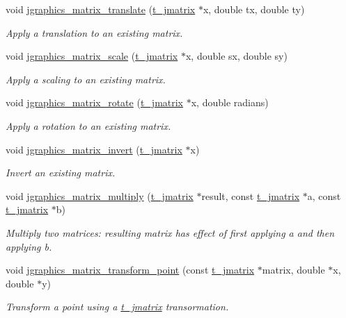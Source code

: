 \begin{DoxyCompactItemize}
void \hyperlink{group__jmatrix_gaf39440de92c4e2164d233761af8ba4b9}{jgraphics\_\-matrix\_\-translate} (\hyperlink{structt__jmatrix}{t\_\-jmatrix} $\ast$x, double tx, double ty)
\begin{DoxyCompactList}\small\item\em Apply a translation to an existing matrix. \item\end{DoxyCompactList}\item 
void \hyperlink{group__jmatrix_gaac1ee9b0dc5e54cc0cb8e5a213df1b51}{jgraphics\_\-matrix\_\-scale} (\hyperlink{structt__jmatrix}{t\_\-jmatrix} $\ast$x, double sx, double sy)
\begin{DoxyCompactList}\small\item\em Apply a scaling to an existing matrix. \item\end{DoxyCompactList}\item 
void \hyperlink{group__jmatrix_gabbe882c283d57b37da55cd4d069b55dc}{jgraphics\_\-matrix\_\-rotate} (\hyperlink{structt__jmatrix}{t\_\-jmatrix} $\ast$x, double radians)
\begin{DoxyCompactList}\small\item\em Apply a rotation to an existing matrix. \item\end{DoxyCompactList}\item 
void \hyperlink{group__jmatrix_gae46840f2ac22aee22c9b211d60f4b381}{jgraphics\_\-matrix\_\-invert} (\hyperlink{structt__jmatrix}{t\_\-jmatrix} $\ast$x)
\begin{DoxyCompactList}\small\item\em Invert an existing matrix. \item\end{DoxyCompactList}\item 
void \hyperlink{group__jmatrix_ga496e878760928eaa1226a3ddf7e265a7}{jgraphics\_\-matrix\_\-multiply} (\hyperlink{structt__jmatrix}{t\_\-jmatrix} $\ast$result, const \hyperlink{structt__jmatrix}{t\_\-jmatrix} $\ast$a, const \hyperlink{structt__jmatrix}{t\_\-jmatrix} $\ast$b)
\begin{DoxyCompactList}\small\item\em Multiply two matrices: resulting matrix has effect of first applying a and then applying b. \item\end{DoxyCompactList}\item 
void \hyperlink{group__jmatrix_gae2fbe033e0d1cae567b9cea4c4c8c91d}{jgraphics\_\-matrix\_\-transform\_\-point} (const \hyperlink{structt__jmatrix}{t\_\-jmatrix} $\ast$matrix, double $\ast$x, double $\ast$y)
\begin{DoxyCompactList}\small\item\em Transform a point using a \hyperlink{structt__jmatrix}{t\_\-jmatrix} transormation. \item\end{DoxyCompactList}\end{DoxyCompactItemize}


